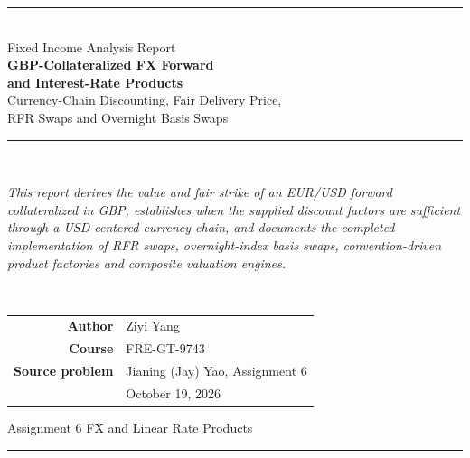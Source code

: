 \documentclass[11pt]{article}
\numberwithin{equation}{section}
\begin{document}
\setlength{\abovedisplayskip}{7pt}
\setlength{\belowdisplayskip}{7pt}
\setlength{\jot}{2pt}
\hypersetup{pageanchor=false}

\begin{titlepage}
\thispagestyle{empty}
\centering
\vspace*{0.55in}
{\color{NYUviolet}\rule{\textwidth}{2.2pt}}\\[10pt]
{\sffamily\fontsize{16}{19}\selectfont\color{inkgrey}Fixed Income Analysis Report}\\[14pt]
{\sffamily\bfseries\fontsize{25}{30}\selectfont\color{NYUviolet}
GBP-Collateralized FX Forward\\[3pt]and Interest-Rate Products}\\[14pt]
{\sffamily\fontsize{15}{18}\selectfont\color{inkgrey}
Currency-Chain Discounting, Fair Delivery Price,\\[3pt]
RFR Swaps and Overnight Basis Swaps}\\[10pt]
{\color{NYUviolet}\rule{\textwidth}{2.2pt}}\\[26pt]
\begin{minipage}{0.88\textwidth}
\centering\itshape\small\color{inkgrey}
This report derives the value and fair strike of an EUR/USD forward
collateralized in GBP, establishes when the supplied discount factors are
sufficient through a USD-centered currency chain, and documents the completed
implementation of RFR swaps, overnight-index basis swaps, convention-driven
product factories and composite valuation engines.
\end{minipage}\\[34pt]
\begin{tabular}{rl}
\sffamily\bfseries Author & Ziyi Yang\\[3pt]
\sffamily\bfseries Course & FRE-GT-9743\\[3pt]
\sffamily\bfseries Source problem & Jianing (Jay) Yao, Assignment 6\\[3pt]
 & October 19, 2026
\end{tabular}
\vfill
{\sffamily\small\color{inkgrey}Assignment 6 \quad\textbullet\quad FX and Linear Rate Products}\\[2pt]
{\color{NYUviolet}\rule{\textwidth}{1.2pt}}
\end{titlepage}
\hypersetup{pageanchor=true}
\end{document}
